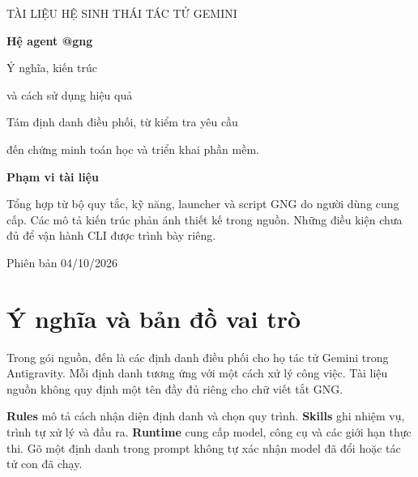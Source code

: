 \documentclass[11pt,a4paper]{article}
\newcommand{\term}[1]{\textbf{\color{forest}#1}}
\newcommand{\keypoint}[1]{\par\smallskip\noindent\colorbox{pale}{\parbox{\dimexpr\linewidth-2\fboxsep\relax}{\color{forest}#1}}\par\smallskip}
\newcommand{\code}[1]{\texttt{\detokenize{#1}}}
\begin{document}
\begin{titlepage}
\color{forest}
\vspace*{1.3cm}
{\sffamily\Large TÀI LIỆU HỆ SINH THÁI TÁC TỬ GEMINI\par}
\vspace{1.0cm}
{\sffamily\bfseries\fontsize{35}{42}\selectfont Hệ agent @gng\par}
\vspace{0.5cm}
{\sffamily\fontsize{21}{28}\selectfont Ý nghĩa, kiến trúc\par và cách sử dụng hiệu quả\par}
\vspace{1.1cm}
\par
\vspace{1.0cm}
{\large Tám định danh điều phối, từ kiểm tra yêu cầu\par đến chứng minh toán học và triển khai phần mềm.\par}
\vfill
\keypoint{\textbf{Phạm vi tài liệu}\par
Tổng hợp từ bộ quy tắc, kỹ năng, launcher và script GNG do người dùng cung cấp. Các mô tả kiến trúc phản ánh thiết kế trong nguồn. Những điều kiện chưa đủ để vận hành CLI được trình bày riêng.}
\vspace{0.4cm}
{\sffamily\large Phiên bản 04/10/2026\par}
\end{titlepage}

\section{Ý nghĩa và bản đồ vai trò}
Trong gói nguồn, \code{@gng1} đến \code{@gng8} là các định danh điều phối cho họ tác tử Gemini trong Antigravity. Mỗi định danh tương ứng với một cách xử lý công việc. Tài liệu nguồn không quy định một tên đầy đủ riêng cho chữ viết tắt GNG.

\term{Rules} mô tả cách nhận diện định danh và chọn quy trình. \term{Skills} ghi nhiệm vụ, trình tự xử lý và đầu ra. \term{Runtime} cung cấp model, công cụ và các giới hạn thực thi. Gõ một định danh trong prompt không tự xác nhận model đã đổi hoặc tác tử con đã chạy.
\end{document}
